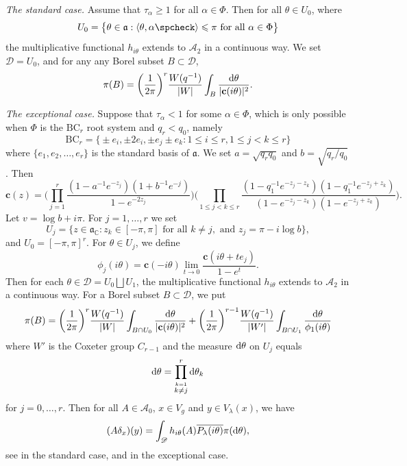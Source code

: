 \documentclass[11pt]{amsart}
\newcommand{\CC}{\mathbb{C}}
\newcommand{\scrA}{\mathscr{A}}
\newcommand{\scrD}{\mathscr{D}}
\newcommand{\bfc}{\mathbf{c}}
\newcommand{\sprod}[2]{\langle {#1}, {#2} \rangle}
\theoremstyle{plain}
\theoremstyle{definition}
\numberwithin{equation}{section}
\begin{document}
\vspace*{1ex}
\noindent
\emph{The standard case.} Assume that $\tau_\alpha \geqslant 1$ for all $\alpha \in \Phi$. Then for all $\theta \in U_0$,
where
\[
	U_0 = \big\{\theta \in \mathfrak{a} : \sprod{\theta}{\alpha\spcheck} \leqslant \pi \text{ for all } \alpha \in \Phi\big\}
\]
the multiplicative functional $h_{i\theta}$ extends to $\scrA_2$ in a continuous way. We set $\scrD = U_0$, and for any
any Borel subset $B \subset \scrD$,
\begin{equation}
	\label{eq:80}
	\pi(B) = 
	\bigg(\frac{1}{2\pi} \bigg)^r
	\frac{W(q^{-1})}{|W|} \int_B \frac{{\rm d} \theta}{|\bfc(i\theta)|^2}.
\end{equation}

\vspace*{1ex}
\noindent
\emph{The exceptional case.}
Suppose that $\tau_\alpha < 1$ for some $\alpha \in \Phi$, which is only possible when $\Phi$ is the $\text{BC}_r$ root system
and $q_r < q_0$, namely
\[
	\text{BC}_r = \big\{\pm e_i, \pm 2 e_i, \pm e_j \pm e_k : 1 \leqslant i \leq r, 1 \leqslant j < k \leqslant r\big\}
\]
where $\{e_1, e_2, \ldots, e_r\}$ is the standard basis of $\mathfrak{a}$. We set $a = \sqrt{q_r q_0}$ and $b= \sqrt{q_r/q_0}$.
Then
\[
	\bfc(z) = \bigg(\prod_{j = 1}^r \frac{(1-a^{-1} e^{-z_j})(1 + b^{-1} e^{-j})}{1 - e^{-2z_j}}\bigg)
	\bigg(\prod_{1 \leqslant j < k \leqslant r} \frac{(1 - q_1^{-1} e^{-z_j-z_k})(1 - q_1^{-1} e^{-z_j + z_k})}
	{(1-e^{-z_j-z_k})(1-e^{-z_j+z_k})}\bigg).
\]
Let $v = \log b + i \pi$. For $j = 1, \ldots, r$ we set
\[
	U_j = \big\{z \in \mathfrak{a}_\CC : z_k \in [-\pi, \pi] \text{ for all } k \neq j, 
	\text{ and } z_j = \pi - i\log b \big\},
\]
and $U_0 = [-\pi, \pi]^r$. For $\theta \in U_j$, we define
\[
	\phi_j(i\theta) = \bfc(-i\theta) \lim_{t \to 0} \frac{\bfc(i\theta+te_j)}{1 - e^t}.
\]
Then for each $\theta \in \scrD = U_0 \bigsqcup U_1$, the multiplicative functional $h_{i\theta}$ extends to $\scrA_2$ in 
a continuous way. For a Borel subset $B \subset \scrD$, we put
\begin{equation}
	\label{eq:81}
	\pi(B)
	= 
	\bigg(\frac{1}{2\pi}\bigg)^r
	\frac{W(q^{-1})}{|W|} \int_{B \cap U_0} \frac{{\rm d} \theta}{|\bfc(i\theta)|^2} 
	+
	\bigg(\frac{1}{2\pi}\bigg)^{r-1}
	\frac{W(q^{-1})}{|W'|} \int_{B \cap U_1} \frac{{\rm d} \theta}{\phi_1(i\theta)}
\end{equation}
where $W'$ is the Coxeter group $C_{r-1}$ and the measure ${\rm d} \theta$ on $U_j$ equals
\[
	{\rm d} \theta = \prod_{\stackrel{k = 1}{k \neq j}}^r {\rm d} \theta_k
\]
for $j = 0, \ldots, r$. Then for all $A \in \scrA_0$, $x \in V_g$ and $y \in V_\lambda(x)$, we have
\begin{equation}
	\label{eq:21}
	(A \delta_x)(y) 
	=
	\int_{\scrD} h_{i\theta}(A) \overline{P_\lambda(i \theta)} \pi({\rm d} \theta),
\end{equation}
see \cite[Theorem 5.2 \& Corollary 5.5]{park2} in the standard case, and
\cite[Theorem 5.7 \& Corollary 5.8]{park2} in the exceptional case.
\end{document}
